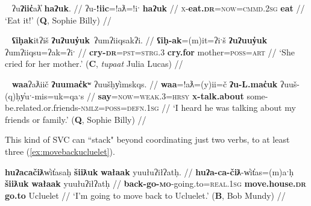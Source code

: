 \ex~ \label{ex:eateat}
\begingl
\glpreamble ʔu\textbf{ʔiic̓}aƛ̓ \textbf{haʔuk}. //
\gla ʔu-\textbf{!iic}=!aƛ=!iˑ \textbf{haʔuk} //
\glb \textsc{x}-\textbf{eat.\textsc{dr}}=\textsc{now}=\textsc{cmmd.2sg} \textbf{eat} //
\glft `Eat it!' (\textbf{Q}, Sophie Billy) //
\endgl
\xe

\ex~ \label{ex:crycry}
\begingl
\glpreamble \textbf{ʕiḥak}itʔiš \textbf{ʔuʔuuy̓uk}\footnotemark\ ʔumʔiiqsakʔi. //
\gla \textbf{ʕiḥ-ak}=(m)it=ʔiˑš \textbf{ʔuʔuuy̓uk} ʔumʔiiqsu=ʔak=ʔiˑ //
\glb \textbf{cry-\textsc{dr}}=\textsc{pst}=\textsc{strg.3} \textbf{cry.for} mother=\textsc{poss}=\textsc{art} //
\glft `She cried for her mother.' (\textbf{C}, \textit{tupaat} Julia Lucas) //
\endgl
\xe


\ex~ \label{ex:sayabout}
\begingl
\glpreamble \textbf{waa}ʔaƛiič \textbf{ʔuumac̓kʷ} ʔuušḥy̓imskqs. //
\gla \textbf{waa}=!aƛ=(y)ii=č \textbf{ʔu-L.mac̓uk} ʔuuš-(q)ḥy̓uˑ-mis=uk=qaˑs //
\glb \textbf{say}=\textsc{now}=\textsc{weak.3}=\textsc{hrsy} \textbf{\textsc{x}-talk.about} some-be.related.or.friends-\textsc{nmlz}=\textsc{poss}=\textsc{defn.1sg} //
\glft `I heard he was talking about my friends or family.' (\textbf{Q}, Sophie Billy) //
\endgl
\xe

This kind of SVC can ``stack" beyond coordinating just two verbs, to at least three (\ref{ex:movebackucluelet}).

\begin{comment}
\ex \label{ex:onlygotostore}
\begingl
\glpreamble \textbf{ʔanasiła}ʔi \textbf{kuw̓iła} \textbf{ʔucačiƛ} makuwił. //
\gla \textbf{ʔana-siła}=!iˑ \textbf{kuw̓iła} \textbf{ʔu-ca-čiƛ} makuwił //
\glb \textbf{only-do}=\textsc{cmmd.2sg} \textbf{go.ahead} \textbf{\textsc{x}-go.to-\textsc{mo}} store //
\glft `Just go to the store.' (\textbf{C}, \textit{tupaat} Julia Lucas) //
\endgl
\xe
\end{comment}

\ex \label{ex:movebackucluelet}
\begingl
\glpreamble \textbf{huʔacačiƛ}w̓it̓asaḥ \textbf{šiiƛuk} \textbf{wałaak} yuułuʔiłʔatḥ. //
\gla \textbf{huʔa-ca-čiƛ}-w̓it̓as=(m)aˑḥ \textbf{šiiƛuk} \textbf{wałaak} yuułuʔiłʔatḥ //
\glb \textbf{back-go-\textsc{mo}}-going.to=\textsc{real.1sg} \textbf{move.house.\textsc{dr}} \textbf{go.to} Ucluelet //
\glft `I'm going to move back to Ucluelet.' (\textbf{B}, Bob Mundy) //
\endgl
\xe

